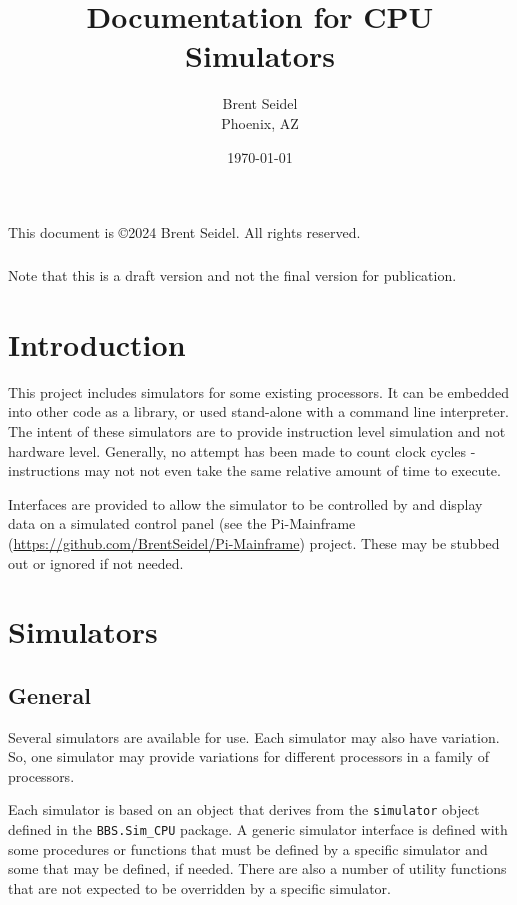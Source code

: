 \documentclass[10pt, openany]{book}
\title{Documentation for CPU Simulators}
\author{Brent Seidel \\ Phoenix, AZ}
\date{ \today }
\begin{document}
\maketitle
\begin{center}
This document is \copyright 2024 Brent Seidel.  All rights reserved.

\paragraph{}Note that this is a draft version and not the final version for publication.
\end{center}
\tableofcontents

\chapter{Introduction}
This project includes simulators for some existing processors.  It can be embedded into other code as a library, or used stand-alone with a command line interpreter.  The intent of these simulators are to provide instruction level simulation and not hardware level.  Generally, no attempt has been made to count clock cycles - instructions may not not even take the same relative amount of time to execute.

Interfaces are provided to allow the simulator to be controlled by and display data on a simulated control panel (see the Pi-Mainframe (\url{https://github.com/BrentSeidel/Pi-Mainframe}) project.  These may be stubbed out or ignored if not needed.

\chapter{Simulators}
\section{General}
Several simulators are available for use.  Each simulator may also have variation.  So, one simulator may provide variations for different processors in a family of processors.

Each simulator is based on an object that derives from the \verb|simulator| object defined in the \verb|BBS.Sim_CPU| package.  A generic simulator interface is defined with some procedures or functions that must be defined by a specific simulator and some that may be defined, if needed.  There are also a number of utility functions that are not expected to be overridden by a specific simulator.
\end{document}
